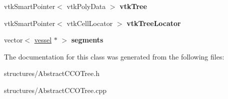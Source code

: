 \begin{DoxyCompactItemize}
\mbox{\label{class_abstract_c_c_o_tree_af3d641bd0dc18e6d5a1cf09a2e6b6e67}} 
vtk\+Smart\+Pointer$<$ vtk\+Poly\+Data $>$ {\bfseries vtk\+Tree}
\item 
\mbox{\label{class_abstract_c_c_o_tree_a6d80c8e0e4816407ed734cc6e2ae0f5e}} 
vtk\+Smart\+Pointer$<$ vtk\+Cell\+Locator $>$ {\bfseries vtk\+Tree\+Locator}
\item 
\mbox{\label{class_abstract_c_c_o_tree_aad48e46e1e55364fdf46c15060e2575f}} 
vector$<$ \mbox{\hyperlink{structvessel}{vessel}} $\ast$ $>$ {\bfseries segments}
\end{DoxyCompactItemize}


The documentation for this class was generated from the following files\+:\begin{DoxyCompactItemize}
\item 
structures/Abstract\+C\+C\+O\+Tree.\+h\item 
structures/Abstract\+C\+C\+O\+Tree.\+cpp\end{DoxyCompactItemize}
